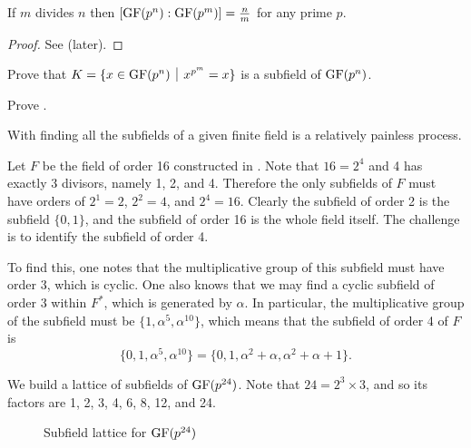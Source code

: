 \begin{corollary}\label{corollary-divisibility-of-finite-field-degree}
    If $m$ divides $n$ then $[\mathrm{GF}(p^n): \mathrm{GF}(p^m)] = \frac nm$ for any prime $p$.
\end{corollary}
\begin{proof}
    See  (later).
\end{proof}

\begin{exercise}\label{exercise-prime-power-elements-idempotent-is-subfield}
    Prove that $K = \{x \in \GF{p^n} \vert x^{p^m} = x\}$ is a subfield of $\mathrm{GF}(p^n)$.
\end{exercise}

\begin{exercise}\label{exercise-divisibility-of-finite-field-degree}
    Prove .
\end{exercise}

With  finding all the subfields of a given finite field is a relatively painless process.

\begin{example}
    Let $F$ be the field of order 16 constructed in . Note that $16 = 2^4$ and 4 has exactly 3 divisors, namely 1, 2, and 4. Therefore the only subfields of $F$ must have orders of $2^1 = 2$, $2^2 = 4$, and $2^4 = 16$. Clearly the subfield of order 2 is the subfield $\{0, 1\}$, and the subfield of order 16 is the whole field itself. The challenge is to identify the subfield of order 4.

    To find this, one notes that the multiplicative group of this subfield must have order 3, which is cyclic. One also knows that we may find a cyclic subfield of order 3 within $F^\ast$, which is generated by $\alpha$. In particular, the multiplicative group of the subfield must be $\{1, \alpha^5, \alpha^{10}\}$, which means that the subfield of order 4 of $F$ is
    \[
        \{0, 1, \alpha^5, \alpha^{10}\} = \{0, 1, \alpha^2 + \alpha, \alpha^2 + \alpha + 1\}.
    \]
\end{example}

\begin{example}
    We build a lattice of subfields of $\mathrm{GF}(p^{24})$. Note that $24 = 2^3 \times 3$, and so its factors are 1, 2, 3, 4, 6, 8, 12, and 24.

    \begin{figure}[H]
        \centering
        \caption{Subfield lattice for $\mathrm{GF}(p^{24})$}
    \end{figure}
\end{example}

